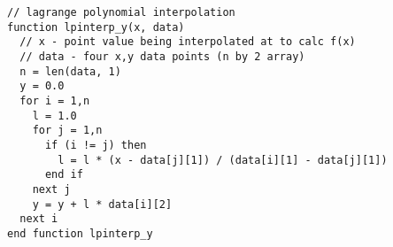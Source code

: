 \begin{lstlisting}[style=sPseudo,caption={Add two numbers function}]
// lagrange polynomial interpolation
function lpinterp_y(x, data)
  // x - point value being interpolated at to calc f(x)
  // data - four x,y data points (n by 2 array)
  n = len(data, 1)
  y = 0.0
  for i = 1,n
    l = 1.0
    for j = 1,n
      if (i != j) then
        l = l * (x - data[j][1]) / (data[i][1] - data[j][1])
      end if
    next j
    y = y + l * data[i][2]
  next i
end function lpinterp_y
\end{lstlisting}

